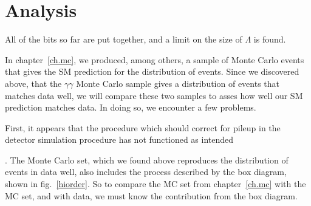 \chapter{Analysis}
All of the bits so far are put together, and a limit on the size of
$\Lambda$ is found.

In chapter~\ref{ch.mc}, we produced, among others, a sample of Monte Carlo events that gives the SM prediction for the distribution of events. Since we discovered above, that the \atlas{} $\gamma\gamma$ Monte Carlo sample gives a distribution of events that matches data well, we will compare these two samples to asses how well our SM prediction matches data. In doing so, we encounter a few problems.

First, it appears that the procedure which should correct for pileup in the detector simulation procedure has not functioned as intended


. The \atlas{} Monte Carlo set, which we found above reproduces the distribution of events in data well, also includes the process described by the box diagram, shown in fig.~\ref{hiorder}. So to compare the MC set from chapter~\ref{ch.mc} with the \atlas{} MC set, and with data, we must know the contribution from the box diagram. 